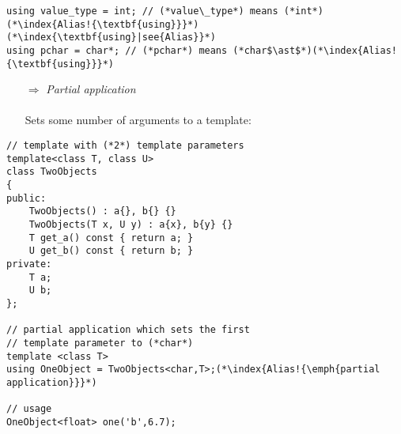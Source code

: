 \documentclass[10pt]{article}
\begin{document}
\begin{lstlisting}
using value_type = int; // (*value\_type*) means (*int*)(*\index{Alias!{\textbf{using}}}*)(*\index{\textbf{using}|see{Alias}}*)
using pchar = char*; // (*pchar*) means (*char$\ast$*)(*\index{Alias!{\textbf{using}}}*)
\end{lstlisting}
\begin{enumerate}
\item[$\Rightarrow$] \emph{Partial application}\\ \\ Sets some number of arguments to a template:
\end{enumerate}
\begin{lstlisting}
// template with (*2*) template parameters
template<class T, class U>
class TwoObjects
{
public:
    TwoObjects() : a{}, b{} {}
    TwoObjects(T x, U y) : a{x}, b{y} {}
    T get_a() const { return a; }
    U get_b() const { return b; }
private:
    T a;
    U b;
};

// partial application which sets the first
// template parameter to (*char*)
template <class T>
using OneObject = TwoObjects<char,T>;(*\index{Alias!{\emph{partial application}}}*)

// usage
OneObject<float> one('b',6.7);
\end{lstlisting}
%
%
\end{document}
